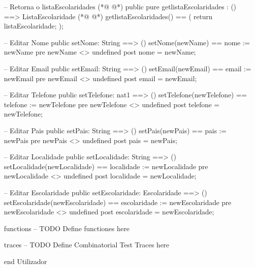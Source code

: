 \begin{vdmpp}[breaklines=true]
 -- Retorna o listaEscolaridades
(*@
\label{getlistaEscolaridades:169}
@*)
 public pure getlistaEscolaridades : () ==> ListaEscolaridade
(*@
\label{setEscolaridade:170}
@*)
 getlistaEscolaridades() ==
 (
  return listaEscolaridade;
 );
 
 -- Editar Nome
 public setNome: String ==> ()
 setNome(newName) == nome := newName
 pre newName <> undefined
 post nome = newName;
 
 -- Editar Email
 public setEmail: String ==> ()
 setEmail(newEmail) == email := newEmail
 pre newEmail <> undefined
 post email = newEmail;
 
 -- Editar Telefone
 public setTelefone: nat1 ==> ()
 setTelefone(newTelefone) == telefone := newTelefone
 pre newTelefone <> undefined
 post telefone = newTelefone;

 -- Editar Pais
 public setPais: String ==> ()
 setPais(newPais) == pais := newPais
 pre newPais <> undefined
 post pais = newPais;
 
 -- Editar Localidade
 public setLocalidade: String ==> ()
 setLocalidade(newLocalidade) == localidade := newLocalidade
 pre newLocalidade <> undefined
 post localidade = newLocalidade;
 
 -- Editar Escolaridade
 public setEscolaridade: Escolaridade ==> ()
 setEscolaridade(newEscolaridade) == escolaridade := newEscolaridade
 pre newEscolaridade <> undefined
 post escolaridade = newEscolaridade;
 
functions
-- TODO Define functiones here

traces
-- TODO Define Combinatorial Test Traces here

end Utilizador
\end{vdmpp}
\bigskip
